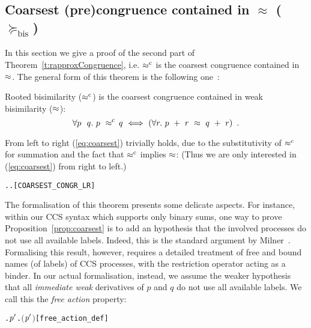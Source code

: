 
\subsection{Coarsest (pre)congruence contained in $\approx$ ($\succeq_{\mathrm{bis}}$)}
\label{s:coarsest}

In this section we give a proof of the second part of
Theorem~\ref{t:rapproxCongruence}, i.e. $\mathrel{\approx^{\rm{c}}}$ is the coarsest
congruence contained in $\approx$. 
The general form of this theorem is the following
one~\cite{van2005characterisation,Gorrieri:2015jt,Mil89}:
\begin{proposition}
\label{prop:coarsest}
  Rooted bisimilarity ($\mathrel{\approx^{\rm{c}}}$) is the coarsest congruence
    contained in weak bisimilarity ($\approx$):
  \begin{equation}
    \label{eq:coarsest}
\forall p\ \ q.\ p\ \rapprox\ \! q\ \Longleftrightarrow\ ( \forall r.\ p\ +\
r\ \approx\ q\ +\ r )\enspace.
\end{equation}
\end{proposition}
From left to right (\ref{eq:coarsest}) trivially holds, due to the substitutivity of
$\mathrel{\approx^{\rm{c}}}$ for summation and the fact that $\mathrel{\approx^{\rm{c}}}$ implies $\approx$: (Thus we are only interested in (\ref{eq:coarsest}) from right to left.)
\begin{alltt}
\HOLTokenTurnstile{} \HOLSymConst{\HOLTokenForall{}} .  \HOLSymConst{\HOLTokenObsCongr}  \HOLSymConst{\HOLTokenImp{}} \HOLSymConst{\HOLTokenForall{}}.  \HOLSymConst{\ensuremath{+}}  \HOLSymConst{\HOLTokenWeakEQ}  \HOLSymConst{\ensuremath{+}} \hfill{[COARSEST_CONGR_LR]}
\end{alltt}

The formalisation of this theorem presents some 
delicate aspects. For instance, 
within our CCS syntax which supports only binary sums,
one way to prove Proposition~\ref{prop:coarsest} is
to add an hypothesis that
 the involved processes do not use all available labels.
 Indeed, this is the standard argument by Milner~\citep[p.~153]{Mil89}.
%
 Formalising this result, however, requires a detailed treatment of
 free and bound names (of labels) of CCS
processes, with the restriction operator acting as a binder.
In our actual formalisation, instead,
we assume the weaker hypothesis that all \emph{immediate weak} derivatives of
$p$ and $q$ do not use all available labels.
We call this the \emph{free action} property:
\begin{alltt}
     \HOLTokenDefEquality{} \HOLSymConst{\HOLTokenExists{}}. \HOLSymConst{\HOLTokenForall{}}\ensuremath{\HOLBoundVar{p}\sp{\prime{}}}. \HOLSymConst{\HOLTokenNeg{}}\ensuremath{(} \HOLTokenWeakTransBegin{} \HOLTokenWeakTransEnd \ensuremath{\HOLBoundVar{p}\sp{\prime{}}}\ensuremath{)}\hfill{[free_action_def]}
\end{alltt}

